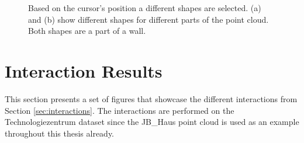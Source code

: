\begin{figure}
\centering
{}
\caption{Based on the cursor's position a different shapes are selected. (a) and (b) show different shapes for different parts of the point cloud. Both shapes are a part of a wall. }
\label{fig:technologiezentrum_interactive_shape_detection}
\end{figure}


\section{Interaction Results}
\label{sec:interaction_results}

This section presents a set of figures that showcase the different interactions from Section \ref{sec:interactions}. The interactions are performed on the Technologiezentrum dataset since the JB\_Haus point cloud is used as an example throughout this thesis already. 


